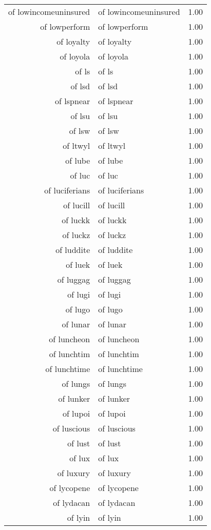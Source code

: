 \begin{table}[ht]
\begin{tabular}{rlr}
  of lowincomeuninsured & of lowincomeuninsured & 1.00 \\ 
  of lowperform & of lowperform & 1.00 \\ 
  of loyalty & of loyalty & 1.00 \\ 
  of loyola & of loyola & 1.00 \\ 
  of ls & of ls & 1.00 \\ 
  of lsd & of lsd & 1.00 \\ 
  of lspnear & of lspnear & 1.00 \\ 
  of lsu & of lsu & 1.00 \\ 
  of lsw & of lsw & 1.00 \\ 
  of ltwyl & of ltwyl & 1.00 \\ 
  of lube & of lube & 1.00 \\ 
  of luc & of luc & 1.00 \\ 
  of luciferians & of luciferians & 1.00 \\ 
  of lucill & of lucill & 1.00 \\ 
  of luckk & of luckk & 1.00 \\ 
  of luckz & of luckz & 1.00 \\ 
  of luddite & of luddite & 1.00 \\ 
  of luek & of luek & 1.00 \\ 
  of luggag & of luggag & 1.00 \\ 
  of lugi & of lugi & 1.00 \\ 
  of lugo & of lugo & 1.00 \\ 
  of lunar & of lunar & 1.00 \\ 
  of luncheon & of luncheon & 1.00 \\ 
  of lunchtim & of lunchtim & 1.00 \\ 
  of lunchtime & of lunchtime & 1.00 \\ 
  of lungs & of lungs & 1.00 \\ 
  of lunker & of lunker & 1.00 \\ 
  of lupoi & of lupoi & 1.00 \\ 
  of luscious & of luscious & 1.00 \\ 
  of lust & of lust & 1.00 \\ 
  of lux & of lux & 1.00 \\ 
  of luxury & of luxury & 1.00 \\ 
  of lycopene & of lycopene & 1.00 \\ 
  of lydacan & of lydacan & 1.00 \\ 
  of lyin & of lyin & 1.00 \\ 

\end{tabular}
\end{table}
